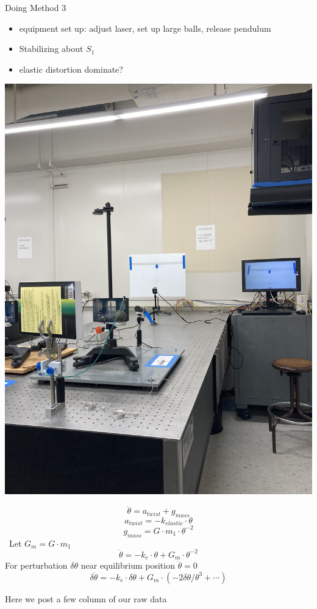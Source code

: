 \documentclass[a4paper]{tufte-handout}
\begin{document}
\hrulefill


Doing Method 3
\begin{itemize}
    \item {equipment set up: } {adjust laser, set up large balls, release pendulum}
    \item {Stabilizing about $S_1$}
    \item {elastic distortion dominate?}
\end{itemize}
\includegraphics[width = 0.5     \textwidth]{figures/day_2.JPG}

$$\ddot{\theta} = a_{\si{twist}}+g_{\si{mass}}$$
$$a_{\si{twist}} = -k_{\si{elastic}}\cdot \theta$$
$$g_{\si{mass}} = G\cdot m_1\cdot \theta^{-2}$$\
Let $G_m = G\cdot m_1$
$$\ddot{\theta} = -k_e\cdot \theta+G_m\cdot \theta^{-2}$$
For perturbation $\delta \theta$ near equilibrium position $\ddot{\theta} = 0$
$$\delta \ddot{\theta} = -k_e\cdot \delta \theta + G_m \cdot \left(-2\delta \theta/ \theta^3+ \cdots \right)$$

Here we post a few column of our raw data
\end{document}

